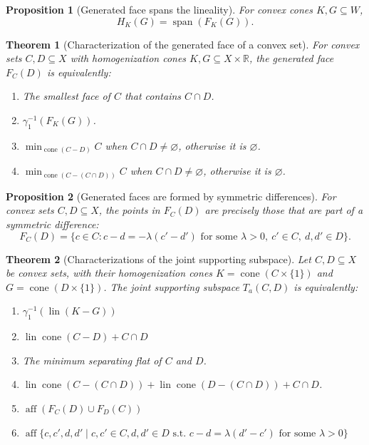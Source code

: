 \documentclass[10pt,a4paper]{amsart}
\newtheorem{theorem}{Theorem}
\newtheorem{proposition}{Proposition}
\DeclareMathOperator{\Span}{\mathrm{span}}
\DeclareMathOperator{\aff}{aff}
\DeclareMathOperator{\cone}{cone}
\DeclareMathOperator{\lin}{lin}
\begin{document}
\begin{proposition}[Generated face spans the lineality]
\label{loc:generated_face_spans_the_lineality.statement}
For convex cones $K, G \subseteq W$,
\begin{equation*}
H_K(G) = \Span(F_K(G)).
\end{equation*}
\end{proposition}

\begin{theorem}[Characterization of the generated face of a convex set]
\label{loc:characterization_of_the_generated_face_of_a_convex_set.statement}
For convex sets $C, D \subseteq X$ with homogenization cones $K, G \subseteq X \times \mathbb{R}$, the generated face 
$F_C(D)$ is equivalently:
\begin{enumerate}
\item The smallest face of $C$ that contains $C \cap D$.
\item $\gamma_1^{-1}(F_K(G))$.
\item $\min_{\cone(C-D)}C$ when $C \cap D \neq \varnothing$, otherwise it is $\varnothing$.
\item $\min_{\cone(C- (C \cap D))}C$ when $C \cap D \neq \varnothing$, otherwise it is $\varnothing$.
\end{enumerate}
\end{theorem}

\begin{proposition}[Generated faces are formed by symmetric differences]
\label{loc:generated_faces_are_formed_by_symmetric_differences.statement}
For convex sets $C, D \subseteq X$, the points in $F_C(D)$ are precisely those that are part of a symmetric difference:
\begin{equation*}
F_C(D) = \{c \in C : c-d = -\lambda(c'-d') \text{ for some } \lambda > 0,\ c' \in C,\ d, d' \in D\}.
\end{equation*}
\end{proposition}

\begin{theorem}[Characterizations of the joint supporting subspace]
\label{loc:affine_cross:lineality.statement}
Let $C, D \subseteq X$ be convex sets,
with their homogenization cones $K = \cone(C \times \{ 1 \})$ and $G = \cone(D \times \{ 1 \})$.
The \emph{joint supporting subspace} $T_a(C, D)$ is equivalently:
\begin{enumerate}
\item $\gamma_1^{-1}(\lin(K-G))$
\item $\lin\cone(C-D) + C \cap D$
\item The minimum separating flat of $C$ and $D$.
\item $\lin \cone(C - (C \cap D)) + \lin \cone(D - (C \cap D)) + C \cap D$.
\item $\aff(F_C(D) \cup F_D(C))$
\item $\aff\{ c,c',d,d'\mid c, c'  \in C , d,d'  \in D \text{ s.t. } c-d = \lambda(d'-c') \text{ for some } \lambda > 0\}$
\end{enumerate}
\end{theorem}
\end{document}
